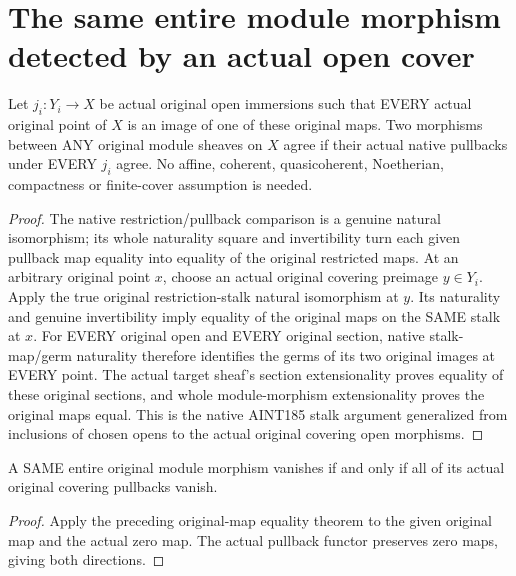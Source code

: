 \section{The same entire module morphism detected by an actual open cover}
\label{sec:scheme-module-open-cover-detection}

\begin{theorem}
\label{sc0-scheme-module-open-cover-detection:whole-map}
\leanok
Let $j_i:Y_i\to X$ be actual original open immersions such that EVERY actual
original point of $X$ is an image of one of these original maps. Two morphisms
between ANY original module sheaves on $X$ agree if their actual native
pullbacks under EVERY $j_i$ agree. No affine, coherent, quasicoherent,
Noetherian, compactness or finite-cover assumption is needed.
\end{theorem}
\begin{proof}
The native restriction/pullback comparison is a genuine natural isomorphism;
its whole naturality square and invertibility turn each given pullback
map equality into equality of the original restricted maps. At an arbitrary
original point $x$, choose an actual original covering preimage $y\in Y_i$.
Apply the true original restriction-stalk natural isomorphism at $y$.
Its naturality and genuine invertibility imply equality of the original
maps on the SAME stalk at $x$. For EVERY original open and EVERY original
section, native stalk-map/germ naturality therefore identifies the germs
of its two original images at EVERY point. The actual target sheaf's
section extensionality proves equality of these original sections, and
whole module-morphism extensionality proves the original maps equal.
This is the native AINT185 stalk argument generalized from inclusions of
chosen opens to the actual original covering open morphisms.
\end{proof}

\begin{corollary}
\label{sc0-scheme-module-open-cover-detection:zero}
\leanok
A SAME entire original module morphism vanishes if and only if all of its
actual original covering pullbacks vanish.
\end{corollary}
\begin{proof}
Apply the preceding original-map equality theorem to the given original
map and the actual zero map. The actual pullback functor preserves zero
maps, giving both directions.
\end{proof}
